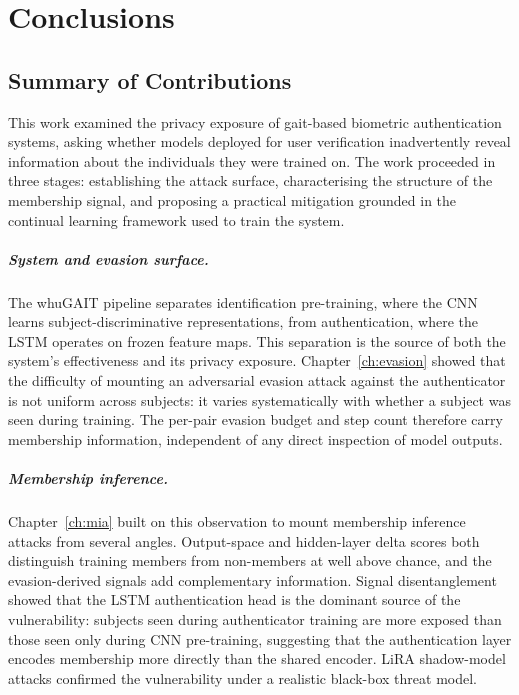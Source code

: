 \chapter{Conclusions}
\label{ch:conclusions}

\section{Summary of Contributions}
\label{sec:con_summary}

This work examined the privacy exposure of gait-based biometric authentication systems, asking whether models deployed for user verification inadvertently reveal information about the individuals they were trained on. The work proceeded in three stages: establishing the attack surface, characterising the structure of the membership signal, and proposing a practical mitigation grounded in the continual learning framework used to train the system.

\paragraph{System and evasion surface.}
The whuGAIT pipeline separates identification pre-training, where the CNN learns subject-discriminative representations, from authentication, where the LSTM operates on frozen feature maps. This separation is the source of both the system's effectiveness and its privacy exposure. Chapter~\ref{ch:evasion} showed that the difficulty of mounting an adversarial evasion attack against the authenticator is not uniform across subjects: it varies systematically with whether a subject was seen during training. The per-pair evasion budget and step count therefore carry membership information, independent of any direct inspection of model outputs.

\paragraph{Membership inference.}
Chapter~\ref{ch:mia} built on this observation to mount membership inference attacks from several angles. Output-space and hidden-layer delta scores both distinguish training members from non-members at well above chance, and the evasion-derived signals add complementary information. Signal disentanglement showed that the LSTM authentication head is the dominant source of the vulnerability: subjects seen during authenticator training are more exposed than those seen only during CNN pre-training, suggesting that the authentication layer encodes membership more directly than the shared encoder. LiRA shadow-model attacks confirmed the vulnerability under a realistic black-box threat model.

